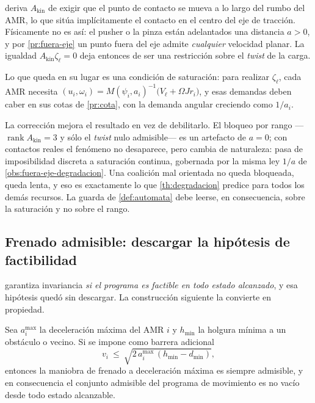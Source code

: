 \begin{observacion}
\label{obs:rigidez-alcance}
 deriva $A_{\mathrm{kin}}$ de exigir que el punto de contacto se
mueva a lo largo del rumbo del AMR, lo que sitúa implícitamente el contacto en el
centro del eje de tracción. Físicamente no es así: el pusher o la pinza están
adelantados una distancia $a>0$, y por \cref{pr:fuera-eje} un punto fuera del eje
admite \emph{cualquier} velocidad planar. La igualdad
$A_{\mathrm{kin}}\zeta_\ell=0$ deja entonces de ser una restricción sobre el
\emph{twist} de la carga.

Lo que queda en su lugar es una condición de saturación: para realizar
$\zeta_\ell$, cada AMR necesita
$(u_i,\omega_i)=M(\psi_i,a_i)^{-1}\bigl(V_\ell+\Omega J r_i\bigr)$, y esas
demandas deben caber en sus cotas de \cref{pr:cota}, con la demanda angular
creciendo como $1/a_i$.

La corrección mejora el resultado en vez de debilitarlo. El bloqueo por rango
—$\operatorname{rank}A_{\mathrm{kin}}=3$ y sólo el \emph{twist} nulo admisible—
es un artefacto de $a=0$; con contactos reales el fenómeno no desaparece, pero
cambia de naturaleza: pasa de imposibilidad discreta a saturación continua,
gobernada por la misma ley $1/a$ de \cref{obs:fuera-eje-degradacion}. Una
coalición mal orientada no queda bloqueada, queda lenta, y eso es exactamente lo
que \cref{th:degradacion} predice para todos los demás recursos. La guarda de
\cref{def:automata} debe leerse, en consecuencia, sobre la saturación y no sobre
el rango.
\end{observacion}

\subsection{Frenado admisible: descargar la hipótesis de factibilidad}

 garantiza invariancia \emph{si el programa es factible en todo
estado alcanzado}, y esa hipótesis quedó sin descargar. La construcción
siguiente la convierte en propiedad.

\begin{lema}
\label{le:astop}
Sea $a^{\max}_i$ la deceleración máxima del AMR $i$ y $h_{\min}$ la holgura
mínima a un obstáculo o vecino. Si se impone como barrera adicional
\[
  v_i\ \le\ \sqrt{2\,a^{\max}_i\,(h_{\min}-d_{\min})},
\]
entonces la maniobra de frenado a deceleración máxima es siempre admisible, y en
consecuencia el conjunto admisible del programa de movimiento es no vacío desde
todo estado alcanzable.
\end{lema}

